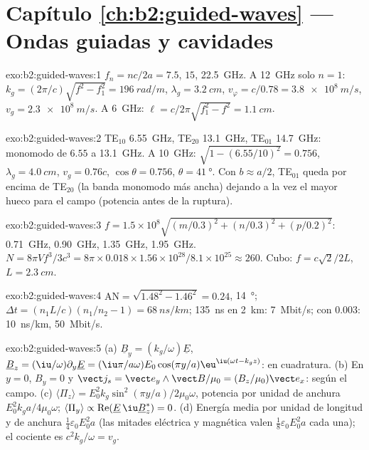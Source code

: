 \section*{Capítulo \ref{ch:b2:guided-waves} --- Ondas guiadas y cavidades}

\begin{solution}{exo:b2:guided-waves:1}
$f_n = nc/2a = 7.5$, $15$, \qty{22.5}{GHz}. A \qty{12}{GHz} solo $n = 1$: $k_g =
(2\pi/c)\sqrt{f^2 - f_1^2} = \qty{196}{rad/m}$, $\lambda_g = \qty{3.2}{cm}$, $v_\varphi = c/0.78
= \qty{3.8e8}{m/s}$, $v_g = \qty{2.3e8}{m/s}$. A \qty{6}{GHz}: $\ell = c/2\pi\sqrt{f_1^2 -
f^2} = \qty{1.1}{cm}$.
\end{solution}

\begin{solution}{exo:b2:guided-waves:2}
TE$_{10}$ \qty{6.55}{GHz}, TE$_{20}$ \qty{13.1}{GHz}, TE$_{01}$ \qty{14.7}{GHz}: monomodo
de $6.55$ a \qty{13.1}{GHz}. A \qty{10}{GHz}: $\sqrt{1 - (6.55/10)^2} =
0.756$, $\lambda_g = \qty{4.0}{cm}$, $v_g = 0.76c$, $\cos\theta = 0.756$, $\theta = \qty{41}{\degree}$.
Con $b \approx a/2$, TE$_{01}$ queda por encima de TE$_{20}$ (la banda monomodo más ancha)
dejando a la vez el mayor hueco para el campo (potencia antes de la ruptura).
\end{solution}

\begin{solution}{exo:b2:guided-waves:3}
$f = 1.5 \times 10^8\sqrt{(m/0.3)^2 + (n/0.3)^2 + (p/0.2)^2}$: \qty{0.71}{GHz}, \qty{0.90}{GHz},
\qty{1.35}{GHz}, \qty{1.95}{GHz}. $N = 8\pi Vf^3/3c^3 = 8\pi \times 0.018 \times 1.56 \times 10^{28}/
8.1 \times 10^{25} \approx 260$. Cubo: $f = c\sqrt2/2L$, $L = \qty{2.3}{cm}$.
\end{solution}

\begin{solution}{exo:b2:guided-waves:4}
$\mathrm{AN} = \sqrt{1.48^2 - 1.46^2} = 0.24$, \qty{14}{\degree}; $\Delta t = (n_1L/c)(n_1/n_2
- 1) = \qty{68}{ns/km}$; \qty{135}{ns} en \qty{2}{km}: \qty{7}{Mbit/s}; con $0.003$:
\qty{10}{ns/km}, \qty{50}{Mbit/s}.
\end{solution}

\begin{solution}{exo:b2:guided-waves:5}
(a) $\underline B_y = (k_g/\omega)\underline E$, $\underline B_z = (\iu/\omega)\partial_y\underline E = (\iu\pi/a\omega)
E_0\cos(\pi y/a)\eu^{\iu(\omega t - k_gz)}$: en cuadratura. (b) En $y = 0$, $B_y = 0$ y
$\vect j_s = \vect e_y\wedge\vect B/\mu_0 = (B_z/\mu_0)\vect e_x$: según el campo. (c)
$\langle\Pi_z\rangle = E_0^2k_g\sin^2(\pi y/a)/2\mu_0\omega$, potencia por unidad de anchura
$E_0^2k_ga/4\mu_0\omega$; $\langle\Pi_y\rangle \propto \operatorname{Re}(\underline E\,\iu\underline B_z^*)
= 0$. (d) Energía media por unidad de longitud y de anchura $\tfrac14\varepsilon_0E_0^2a$ (las mitades
eléctrica y magnética valen $\tfrac18\varepsilon_0E_0^2a$ cada una); el cociente es $c^2k_g/\omega = v_g$.
\end{solution}

